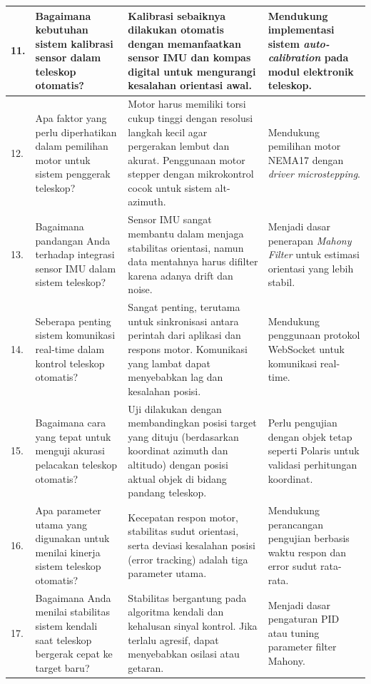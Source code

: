 \begin{longtable}{| b{} | p{} | p{} | p{} |}
	11. & Bagaimana kebutuhan sistem kalibrasi sensor dalam teleskop otomatis? &
	Kalibrasi sebaiknya dilakukan otomatis dengan memanfaatkan sensor IMU dan kompas digital untuk mengurangi kesalahan orientasi awal. &
	Mendukung implementasi sistem \textit{auto-calibration} pada modul elektronik teleskop. \\
	\hline
	
	12. & Apa faktor yang perlu diperhatikan dalam pemilihan motor untuk sistem penggerak teleskop? &
	Motor harus memiliki torsi cukup tinggi dengan resolusi langkah kecil agar pergerakan lembut dan akurat. Penggunaan motor stepper dengan mikrokontrol cocok untuk sistem alt-azimuth. &
	Mendukung pemilihan motor NEMA17 dengan \textit{driver microstepping}. \\
	\hline
	
	13. & Bagaimana pandangan Anda terhadap integrasi sensor IMU dalam sistem teleskop? &
	Sensor IMU sangat membantu dalam menjaga stabilitas orientasi, namun data mentahnya harus difilter karena adanya drift dan noise. &
	Menjadi dasar penerapan \textit{Mahony Filter} untuk estimasi orientasi yang lebih stabil. \\
	\hline
	
	14. & Seberapa penting sistem komunikasi real-time dalam kontrol teleskop otomatis? &
	Sangat penting, terutama untuk sinkronisasi antara perintah dari aplikasi dan respons motor. Komunikasi yang lambat dapat menyebabkan lag dan kesalahan posisi. &
	Mendukung penggunaan protokol WebSocket untuk komunikasi real-time. \\
	\hline
	
	15. & Bagaimana cara yang tepat untuk menguji akurasi pelacakan teleskop otomatis? &
	Uji dilakukan dengan membandingkan posisi target yang dituju (berdasarkan koordinat azimuth dan altitudo) dengan posisi aktual objek di bidang pandang teleskop. &
	Perlu pengujian dengan objek tetap seperti Polaris untuk validasi perhitungan koordinat. \\
	\hline
	
	16. & Apa parameter utama yang digunakan untuk menilai kinerja sistem teleskop otomatis? &
	Kecepatan respon motor, stabilitas sudut orientasi, serta deviasi kesalahan posisi (error tracking) adalah tiga parameter utama. &
	Mendukung perancangan pengujian berbasis waktu respon dan error sudut rata-rata. \\
	\hline
	
	17. & Bagaimana Anda menilai stabilitas sistem kendali saat teleskop bergerak cepat ke target baru? &
	Stabilitas bergantung pada algoritma kendali dan kehalusan sinyal kontrol. Jika terlalu agresif, dapat menyebabkan osilasi atau getaran. &
	Menjadi dasar pengaturan PID atau tuning parameter filter Mahony. \\
	\hline
	

\end{longtable}
